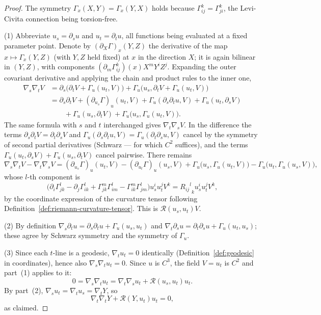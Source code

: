 \begin{proof}
\leanok
{}
The symmetry $\Gamma_x(X,Y)=\Gamma_x(Y,X)$ holds because
$\Gamma^k_{ij}=\Gamma^k_{ji}$, the Levi-Civita connection being
torsion-free.

(1) Abbreviate $u_s=\partial_su$ and $u_t=\partial_tu$, all
functions being evaluated at a fixed parameter point. Denote by
$(\partial_X\Gamma)_x(Y,Z)$ the derivative of the map
$x\mapsto\Gamma_x(Y,Z)$ (with $Y,Z$ held fixed) at $x$ in the
direction $X$; it is again bilinear in $(Y,Z)$, with components
$(\partial_m\Gamma^k_{ij})(x)X^mY^iZ^j$. Expanding the outer
covariant derivative and applying the chain and product rules to the
inner one,
\begin{align*}
\nabla_s\nabla_tV
&=\partial_s\bigl(\partial_tV+\Gamma_u(u_t,V)\bigr)
  +\Gamma_u\bigl(u_s,\partial_tV+\Gamma_u(u_t,V)\bigr)\\
&=\partial_s\partial_tV
  +(\partial_{u_s}\Gamma)_u(u_t,V)
  +\Gamma_u(\partial_s\partial_tu,V)
  +\Gamma_u(u_t,\partial_sV)\\
&\qquad+\Gamma_u(u_s,\partial_tV)
  +\Gamma_u\bigl(u_s,\Gamma_u(u_t,V)\bigr).
\end{align*}
The same formula with $s$ and $t$ interchanged gives
$\nabla_t\nabla_sV$. In the difference the terms
$\partial_s\partial_tV=\partial_t\partial_sV$ and
$\Gamma_u(\partial_s\partial_tu,V)=\Gamma_u(\partial_t\partial_su,V)$
cancel by the symmetry of second partial derivatives (Schwarz — for
which $C^2$ suffices), and the terms
$\Gamma_u(u_t,\partial_sV)+\Gamma_u(u_s,\partial_tV)$ cancel
pairwise. There remains
$$\nabla_s\nabla_tV-\nabla_t\nabla_sV
=(\partial_{u_s}\Gamma)_u(u_t,V)-(\partial_{u_t}\Gamma)_u(u_s,V)
+\Gamma_u\bigl(u_s,\Gamma_u(u_t,V)\bigr)
-\Gamma_u\bigl(u_t,\Gamma_u(u_s,V)\bigr),$$
whose $l$-th component is
$$\bigl(\partial_i\Gamma^l_{jk}-\partial_j\Gamma^l_{ik}
+\Gamma^m_{jk}\Gamma^l_{im}-\Gamma^m_{ik}\Gamma^l_{jm}\bigr)
u_s^iu_t^jV^k={{R_{ij}}^l}_ku_s^iu_t^jV^k,$$
by the coordinate expression of the curvature tensor following
Definition~\ref{def:riemann-curvature-tensor}. This is
${\mathcal R}(u_s,u_t)V$.

(2) By definition
$\nabla_s\partial_tu=\partial_s\partial_tu+\Gamma_u(u_s,u_t)$ and
$\nabla_t\partial_su=\partial_t\partial_su+\Gamma_u(u_t,u_s)$; these
agree by Schwarz symmetry and the symmetry of $\Gamma_u$.

(3) Since each $t$-line is a geodesic, $\nabla_tu_t=0$ identically
(Definition~\ref{def:geodesic} in coordinates), hence also
$\nabla_s\nabla_tu_t=0$. Since $u$ is $C^3$, the field $V=u_t$ is
$C^2$ and part~(1) applies to it:
$$0=\nabla_s\nabla_tu_t
=\nabla_t\nabla_su_t+{\mathcal R}(u_s,u_t)u_t.$$
By part~(2), $\nabla_su_t=\nabla_tu_s=\nabla_tY$, so
$$\nabla_t\nabla_tY+{\mathcal R}(Y,u_t)u_t=0,$$
as claimed.
\end{proof}

